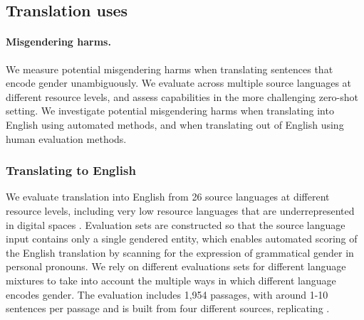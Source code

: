 \subsection{Translation uses}
\label{app:rai-translation}
\paragraph{Misgendering harms.} We measure potential misgendering harms when translating sentences that encode gender unambiguously.  We evaluate across multiple source languages at different resource levels, and assess capabilities in the more challenging zero-shot setting.  We investigate potential misgendering harms when translating into English using automated methods, and when translating out of English using human evaluation methods.

\subsubsection{Translating to English}

We evaluate translation into English from 26 source languages at different resource levels, including very low resource languages that are underrepresented in digital spaces \citep{Bapna2022-mp}. Evaluation sets are constructed so that the source language input contains only a single gendered entity, which enables automated scoring of the English translation by scanning for the expression of grammatical gender in personal pronouns. We rely on different evaluations sets for different language mixtures to take into account the multiple ways in which different language encodes gender.  The evaluation includes 1,954 passages, with around 1-10 sentences per passage and is built from four different sources, replicating \cite{chung2022scaling}.

